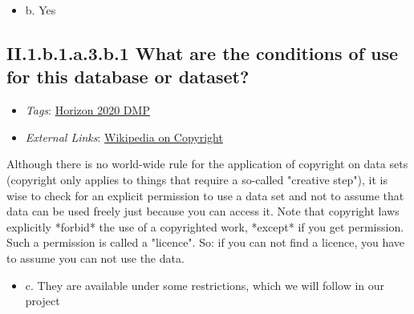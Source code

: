 \documentclass[a4paper,12pt]{report}
\begin{document}
\begin{itemize}
  \item[\CheckmarkBold] b. Yes
\end{itemize}




\subsection*{\protect\textcolor{colorSecId}{II.1.b.1.a.3.b.1} What are the conditions of use for this database or dataset?}

\label{82fd0cce-2b41-423f-92ad-636d0872045c.efc80cc8-8318-4f8c-acb7-dc1c60e491c1.2663b978-5125-4224-9930-0a50dbe895c9.fcc51962-08df-4f4c-85ad-6bb932107010.0b1610c4-5030-43a3-8a6c-c69693351a79.58401091-2d48-4231-983a-c972d11d9f6e.8a1937d8-39dc-4efd-a3f6-b62e789f225b.aee03da5-b399-4274-8db4-fac82c6210d3}


\begin{itemize}
  \item \textit{Tags}: \ul{Horizon 2020 DMP}
  
  \item \textit{External Links}: \href{https://en.wikipedia.org/wiki/Copyright}{Wikipedia on Copyright}\end{itemize}


\noindent
\begin{markdown}
Although there is no world-wide rule for the application of copyright on data sets (copyright only applies to things that require a so-called "creative step"), it is wise to check for an explicit permission to use a data set and not to assume that data can be used freely just because you can access it. 
Note that copyright laws explicitly *forbid* the use of a copyrighted work, *except* if you get permission. Such a permission is called a "licence". So: if you can not find a licence, you have to assume you can not use the data.
\end{markdown}



\begin{itemize}
  \item[\CheckmarkBold] c. They are available under some restrictions, which we will follow in our project
\end{itemize}
\end{document}
